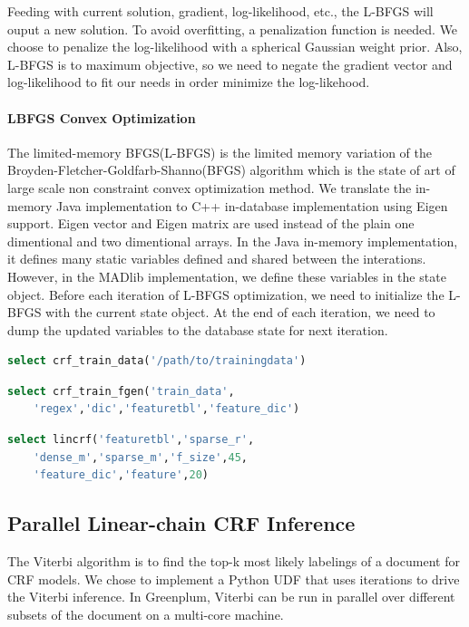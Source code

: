 \documentclass[11pt,letterpaper]{article}
\begin{document}
Feeding with current solution, gradient, log-likelihood, etc., the L-BFGS will ouput a new solution.
To avoid overfitting, a penalization function is needed. We choose to penalize the log-likelihood with a spherical Gaussian weight prior.
Also, L-BFGS is to maximum objective, so we need to negate the gradient vector and log-likelihood to fit our needs in order minimize the log-likehood.

\paragraph{LBFGS Convex Optimization}
The limited-memory BFGS(L-BFGS) is the limited memory variation of the Broyden-Fletcher-Goldfarb-Shanno(BFGS) algorithm which
is the state of art of large scale non constraint convex optimization method.
We translate the in-memory Java implementation to C++ in-database implementation using Eigen support.
Eigen vector and Eigen matrix are used instead of the plain one dimentional and two dimentional arrays.
In the Java in-memory implementation, it defines many static variables defined and shared between the interations.
However, in the MADlib implementation, we define these variables in the state object.
Before each iteration of L-BFGS optimization, we need to initialize the L-BFGS with the current state object. 
At the end of each iteration, we need to dump the updated variables to the database state for next iteration.

\begin{lstlisting}[language=SQL,gobble=4]
    select crf_train_data('/path/to/trainingdata')
\end{lstlisting}

\begin{lstlisting}[language=SQL,gobble=4]
    select crf_train_fgen('train_data', 
    'regex','dic','featuretbl','feature_dic')
\end{lstlisting}

\begin{lstlisting}[language=SQL,gobble=4]
    select lincrf('featuretbl','sparse_r',
    'dense_m','sparse_m','f_size',45, 
    'feature_dic','feature',20)
\end{lstlisting}

\subsection{Parallel Linear-chain CRF Inference}
 The Viterbi algorithm is to find the top-k most likely labelings of a document 
for CRF models. 
We chose to implement a Python UDF that uses iterations to drive the Viterbi inference. 
In Greenplum, Viterbi can be run in parallel over different subsets 
of the document on a multi-core machine.
\end{document}
